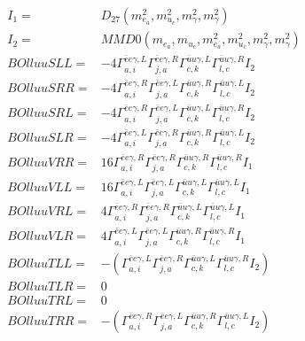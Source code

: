 \documentclass[A4,landscape]{article}
\begin{document}
\begin{align} 
I_1 = & D_{27}(m^2_{e_{{a}}}, m^2_{u_{{c}}}, m^2_{\gamma}, m^2_{\gamma}) \\ 
I_2 = & MMD0(m_{e_{{a}}}, m_{u_{{c}}}, m^2_{e_{{a}}}, m^2_{u_{{c}}}, m^2_{\gamma}, m^2_{\gamma}) \\ 
  BOlluuSLL= & -4  \Gamma^{\bar{e}e \gamma ,L}_{a, i} \Gamma^{\bar{e}e \gamma ,R}_{j, a} \Gamma^{\bar{u}u \gamma ,L}_{c, k} \Gamma^{\bar{u}u \gamma ,R}_{l, c} I_2 \\ 
  BOlluuSRR= & -4  \Gamma^{\bar{e}e \gamma ,R}_{a, i} \Gamma^{\bar{e}e \gamma ,L}_{j, a} \Gamma^{\bar{u}u \gamma ,R}_{c, k} \Gamma^{\bar{u}u \gamma ,L}_{l, c} I_2 \\ 
  BOlluuSRL= & -4  \Gamma^{\bar{e}e \gamma ,R}_{a, i} \Gamma^{\bar{e}e \gamma ,L}_{j, a} \Gamma^{\bar{u}u \gamma ,L}_{c, k} \Gamma^{\bar{u}u \gamma ,R}_{l, c} I_2 \\ 
  BOlluuSLR= & -4  \Gamma^{\bar{e}e \gamma ,L}_{a, i} \Gamma^{\bar{e}e \gamma ,R}_{j, a} \Gamma^{\bar{u}u \gamma ,R}_{c, k} \Gamma^{\bar{u}u \gamma ,L}_{l, c} I_2 \\ 
  BOlluuVRR= & 16  \Gamma^{\bar{e}e \gamma ,R}_{a, i} \Gamma^{\bar{e}e \gamma ,R}_{j, a} \Gamma^{\bar{u}u \gamma ,R}_{c, k} \Gamma^{\bar{u}u \gamma ,R}_{l, c} I_1 \\ 
  BOlluuVLL= & 16  \Gamma^{\bar{e}e \gamma ,L}_{a, i} \Gamma^{\bar{e}e \gamma ,L}_{j, a} \Gamma^{\bar{u}u \gamma ,L}_{c, k} \Gamma^{\bar{u}u \gamma ,L}_{l, c} I_1 \\ 
  BOlluuVRL= & 4  \Gamma^{\bar{e}e \gamma ,R}_{a, i} \Gamma^{\bar{e}e \gamma ,R}_{j, a} \Gamma^{\bar{u}u \gamma ,L}_{c, k} \Gamma^{\bar{u}u \gamma ,L}_{l, c} I_1 \\ 
  BOlluuVLR= & 4  \Gamma^{\bar{e}e \gamma ,L}_{a, i} \Gamma^{\bar{e}e \gamma ,L}_{j, a} \Gamma^{\bar{u}u \gamma ,R}_{c, k} \Gamma^{\bar{u}u \gamma ,R}_{l, c} I_1 \\ 
  BOlluuTLL= & -( \Gamma^{\bar{e}e \gamma ,L}_{a, i} \Gamma^{\bar{e}e \gamma ,R}_{j, a} \Gamma^{\bar{u}u \gamma ,L}_{c, k} \Gamma^{\bar{u}u \gamma ,R}_{l, c} I_2) \\ 
  BOlluuTLR= & 0 \\ 
  BOlluuTRL= & 0 \\ 
  BOlluuTRR= & -( \Gamma^{\bar{e}e \gamma ,R}_{a, i} \Gamma^{\bar{e}e \gamma ,L}_{j, a} \Gamma^{\bar{u}u \gamma ,R}_{c, k} \Gamma^{\bar{u}u \gamma ,L}_{l, c} I_2) \\ 
\end{align} 
\end{document}

